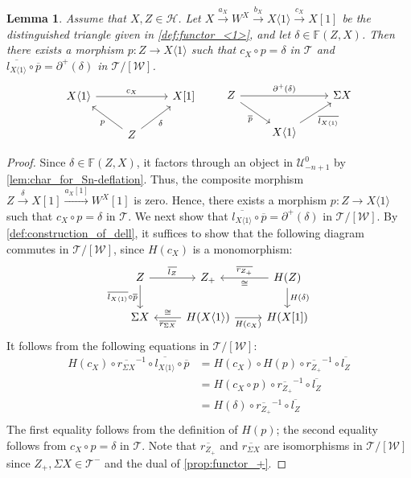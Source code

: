 \documentclass[a4paper,reqno,10pt]{amsart}
\DeclareRobustCommand{\darkblueedit}[1]{#1}
\newtheorem{lemma}[lemma]{Lemma}
\theoremstyle{definition}
\theoremstyle{definition}
\theoremstyle{definition}
\theoremstyle{definition}
\theoremstyle{plain}
\newcommand{\ovl}[1]{\overline{#1}}
\newcommand{\BF}{\mathbb{F}}
\newcommand{\CH}{\mathcal{H}}
\newcommand{\CT}{\mathcal{T}}
\newcommand{\CU}{\mathcal{U}}
\newcommand{\CW}{\mathcal{W}}
\newcommand{\Ar}[3]{\ar[from=#1,to=#2,#3]}
\begin{document}
\color{blue}

\begin{lemma}
\label{lem:partial_description}
Assume that $X,Z\in\CH$. 
Let $X\xrightarrow{a_X} W^X\xrightarrow{b_X} X\langle 1\rangle\xrightarrow{c_X} X[1]$ be the distinguished triangle given in \cref{def:functor_<1>}, and let $\delta\in \BF(Z,X)$. %
Then there exists a morphism $p\colon Z\to X\langle 1\rangle$ such that $c_X\circ p=\delta$ in $\CT$ and $\ovl{l_{X\langle 1\rangle}}\circ\ovl{p}=\partial^+(\delta)$ in $\CT/[\CW]$.
$$
\begin{tikzcd}
X\langle 1\rangle & & X[1] \\
&Z&
\Ar{2-2}{1-1}{"p"}
\Ar{2-2}{1-3}{"\delta"'}
\Ar{1-1}{1-3}{"c_X"}
\end{tikzcd}\quad\quad
\begin{tikzcd}
Z && \Sigma X \\
& X\langle 1\rangle
\Ar{1-1}{1-3}{"\partial^+(\delta)"}
\Ar{1-1}{2-2}{"\ovl{p}"'}
\Ar{2-2}{1-3}{"\ovl{l_{X\langle 1\rangle}}"'}
\end{tikzcd}
$$
\end{lemma}
\begin{proof}
Since $\delta\in \BF(Z,X)$, it factors through an object in $\CU_{-n+1}^0$ by \cref{lem:char_for_Sn-deflation}. Thus, the composite morphism $Z\xrightarrow{\delta}X[1]\xrightarrow{a_X[1]} W^X[1]$ is zero. Hence, there exists a morphism $p\colon Z\to X\langle 1\rangle$ such that $c_X\circ p=\delta$ in $\CT$. We next show that $\ovl{l_{X\langle 1\rangle}}\circ\ovl{p}=\partial^+(\delta)$ in $\CT/[\CW]$. By \cref{def:construction_of_dell}, it suffices to show that the following diagram commutes in $\CT/[\CW]$, since $H(c_X)$ is a monomorphism:
$$
\begin{tikzcd}
Z & Z_+ & H(Z) \\
\Sigma X & H(X\langle 1\rangle) & H(X[1])
\Ar{1-1}{1-2}{"\ovl{l_Z}"}
\Ar{1-3}{1-2}{"\ovl{r_{Z_+}}"',"\cong"}
\Ar{1-3}{2-3}{"H(\delta)"}
\Ar{2-2}{2-1}{"\ovl{r_{\Sigma X}}","\cong"'}
\Ar{2-2}{2-3}{"H(c_X)"'}
\Ar{1-1}{2-1}{"\ovl{l_{X\langle1\rangle}}\circ \ovl{p}"'}
\end{tikzcd}
$$
It follows from the following equations in $\CT/[\CW]$:
\begin{align*}
H(c_X)\circ \ovl{r_{\Sigma X}}^{-1}\circ \ovl{l_{X\langle 1\rangle}}\circ \ovl{p} 
&=H(c_X)\circ H(p) \circ \ovl{r_{Z_+}}^{-1}\circ \ovl{l_{Z}}\\
&=H(c_X\circ p) \circ \ovl{r_{Z_+}}^{-1}\circ \ovl{l_{Z}}\\ 
&=H(\delta) \circ \ovl{r_{Z_+}}^{-1}\circ \ovl{l_{Z}}\\ 
\end{align*}
\darkblueedit{The first equality follows from the definition of $H(p)$; the second equality follows from $c_X\circ p=\delta$ in $\CT$.} Note that $\ovl{r_{Z_+}}$ and $\ovl{r_{\Sigma X}}$ are isomorphisms in $\CT/[\CW]$ since $Z_+, \Sigma X\in \CT^-$ and the dual of \cref{prop:functor_+}.
\end{proof}
\end{document}
